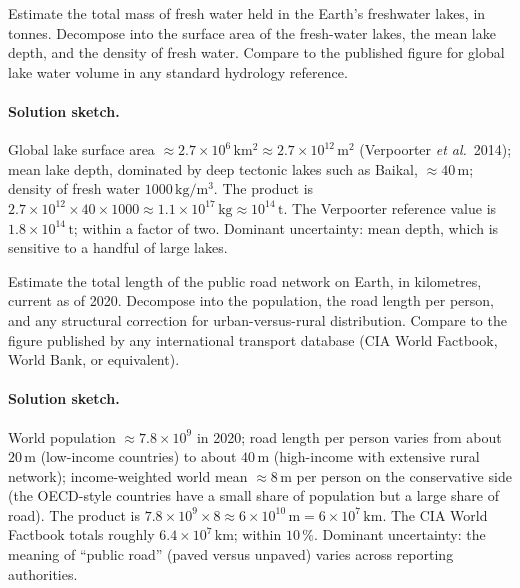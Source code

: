 \begin{exercise}
Estimate the total mass of fresh water held in the Earth's
freshwater lakes, in tonnes. Decompose into the surface area of the
fresh-water lakes, the mean lake depth, and the density of fresh
water. Compare to the published figure for global lake water volume
in any standard hydrology reference.
\end{exercise}

\paragraph{Solution sketch.}
Global lake surface area $\approx 2.7 \times 10^{6} \,\si{\kilo\meter
\squared} \approx 2.7 \times 10^{12} \,\si{\meter\squared}$ (Verpoorter
\emph{et al.}\ 2014); mean lake depth, dominated by deep tectonic
lakes such as Baikal, $\approx 40 \,\si{\meter}$; density of fresh
water $1000 \,\si{\kilo\gram\per\meter\cubed}$. The product is
$2.7 \times 10^{12} \times 40 \times 1000 \approx 1.1 \times 10^{17}
\,\si{\kilo\gram} \approx 10^{14} \,\si{\tonne}$. The Verpoorter
reference value is $1.8 \times 10^{14} \,\si{\tonne}$; within a
factor of two. Dominant uncertainty: mean depth, which is sensitive
to a handful of large lakes.

\begin{exercise}
Estimate the total length of the public road network on Earth, in
kilometres, current as of 2020. Decompose into the population, the
road length per person, and any structural correction for
urban-versus-rural distribution. Compare to the figure published by
any international transport database (CIA World Factbook, World Bank,
or equivalent).
\end{exercise}

\paragraph{Solution sketch.}
World population $\approx 7.8 \times 10^{9}$ in 2020; road length
per person varies from about $20 \,\si{\meter}$ (low-income
countries) to about $40 \,\si{\meter}$ (high-income with extensive
rural network); income-weighted world mean $\approx 8 \,\si{\meter}$
per person on the conservative side (the OECD-style countries have a
small share of population but a large share of road). The product is
$7.8 \times 10^{9} \times 8 \approx 6 \times 10^{10} \,\si{\meter}
= 6 \times 10^{7} \,\si{\kilo\meter}$. The CIA World Factbook
totals roughly $6.4 \times 10^{7} \,\si{\kilo\meter}$; within
$10\,\%$. Dominant uncertainty: the meaning of ``public road'' (paved
versus unpaved) varies across reporting authorities.

